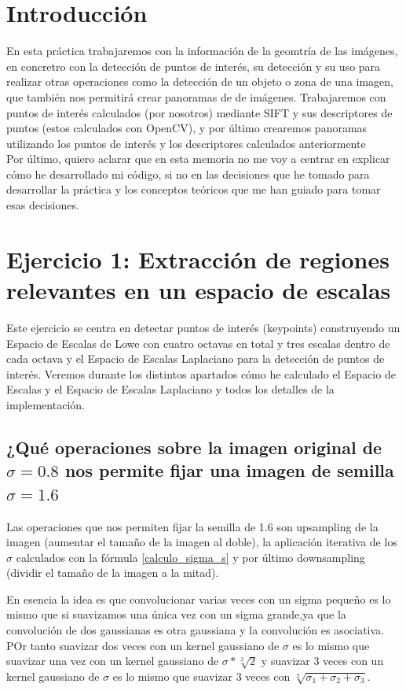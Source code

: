 \documentclass[12pt,spanish]{article}
\begin{document}
\section*{Introducción}
En esta práctica trabajaremos con la información de la geomtría de las imágenes, en concretro con la detección de puntos de interés, su detección y su uso para realizar otras operaciones como la detección de un objeto o zona de una imagen, que también nos permitirá crear panoramas de de imágenes. Trabajaremos con puntos de interés calculados (por nosotros) mediante SIFT y sus descriptores de puntos (estos calculados con OpenCV), y por último crearemos panoramas utilizando los puntos de interés y los descriptores calculados anteriormente\\


Por último, quiero aclarar que en esta memoria no me voy a centrar en explicar cómo he desarrollado mi código, si no en las decisiones que he tomado para desarrollar la práctica y los conceptos teóricos que me han guiado para tomar esas decisiones.


\section{Ejercicio 1: Extracción de regiones relevantes en un espacio de escalas}
Este ejercicio se centra en detectar puntos de interés (keypoints) construyendo un Espacio de Escalas de Lowe con cuatro octavas en total y tres escalas dentro de cada octava y el Espacio de Escalas Laplaciano para la detección de puntos de interés. Veremos durante los distintos apartados cómo he calculado el Espacio de Escalas y el Espacio de Escalas Laplaciano y todos los detalles de la implementación.

\subsection{¿Qué operaciones sobre la imagen original de $\sigma = 0.8$ nos permite fijar una imagen de semilla $\sigma = 1.6$}
Las operaciones que nos permiten fijar la semilla de 1.6 son upsampling de la imagen (aumentar el tamaño de la imagen al doble), la aplicación iterativa de los $\sigma$ calculados con la fórmula \ref{calculo_sigma_s} y por último downsampling (dividir el tamaño de la imagen a la mitad).

En esencia la idea es que convolucionar varias veces con un sigma pequeño es lo mismo que si suavizamos una única vez con un sigma grande,ya que la convolución de dos gaussianas es otra gaussiana y la convolución es asociativa. POr tanto suavizar dos veces con un kernel gaussiano de $\sigma$ es lo mismo que suavizar una vez con un kernel gaussiano de $\sigma * \sqrt[2]{2}$ y suavizar 3 veces con un kernel gaussiano de $\sigma$ es lo mismo que suavizar 3 veces con $\sqrt[2]{\sigma_1 + \sigma_2 + \sigma_3}$.
\end{document}
